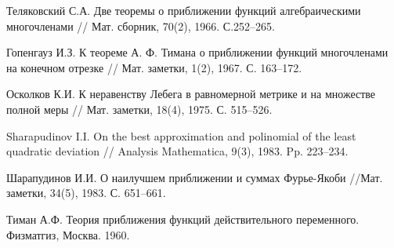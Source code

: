 \begin{thebibliography}{999}
{Теляковский С.А.}
 Две теоремы о приближении функций алгебраическими многочленами
// Мат. сборник, 70(2), 1966. С.252--265.

{Гопенгауз И.З.}
 К теореме А. Ф. Тимана о приближении функций многочленами на конечном отрезке
// Мат. заметки, 1(2), 1967. С. 163--172.

{Осколков К.И.}
 К неравенству Лебега в равномерной метрике и на множестве полной меры
// Мат.  заметки, 18(4), 1975. С. 515--526.

{Sharapudinov I.I.}
 On the best approximation and polinomial of the least quadratic deviation
// Analysis Mathematica, 9(3), 1983. Pp. 223--234.

{Шарапудинов И.И.}
 О наилучшем приближении и суммах Фурье-Якоби
//Мат. заметки, 34(5), 1983. С. 651--661.

{Тиман А.Ф.} Теория приближения функций действительного переменного. Физматгиз, Москва. 1960.

\end{thebibliography}
